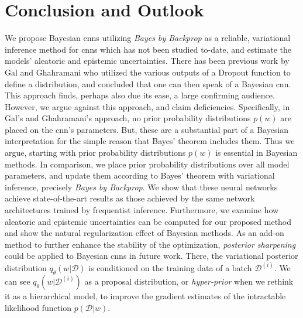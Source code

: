 \chapter{Conclusion and Outlook}

We propose Bayesian \acp{cnn} utilizing \textit{Bayes by Backprop} as a reliable, variational inference method for \acp{cnn} which has not been studied to-date, and estimate the models' aleatoric and epistemic uncertainties.
\newline There has been previous work by Gal and Ghahramani \cite{gal2015bayesian} who utilized the various outputs of a Dropout function to define a distribution, and concluded that one can then speak of a Bayesian \ac{cnn}. This approach finds, perhaps also due its ease, a large confirming audience. However, we argue against this approach, and claim deficiencies. Specifically, in Gal's and Ghahramani's \cite{gal2015bayesian} approach, no prior probability distributions $p(w)$ are placed on the \ac{cnn}'s parameters. But, these are a substantial part of a Bayesian interpretation for the simple reason that Bayes' theorem includes them. Thus we argue, starting with prior probability distributions $p(w)$ is essential in Bayesian methods. In comparison, we place prior probability distributions over all model parameters, and update them according to Bayes' theorem with variational inference, precisely \textit{Bayes by Backprop}. We show that these neural networks achieve state-of-the-art results as those achieved by the same network architectures trained by frequentist inference. Furthermore, we examine how aleatoric and epistemic uncertainties can be computed for our proposed method and show the natural regularization effect of Bayesian methods.
\newline As an add-on method to further enhance the stability of the optimization, \textit{posterior sharpening} \cite{fortunato2017bayesian} could be applied to Bayesian \acp{cnn} in future work. There, the variational posterior distribution $q_{\theta}(w|\mathcal{D})$ is conditioned on the training data of a batch $\mathcal{D}^{(i)}$. We can see $q_{\theta}(w|\mathcal{D}^{(i)})$ as a proposal distribution, or \textit{hyper-prior} when we rethink it as a hierarchical model, to improve the gradient estimates of the intractable likelihood function $p(\mathcal{D}|w)$.
%